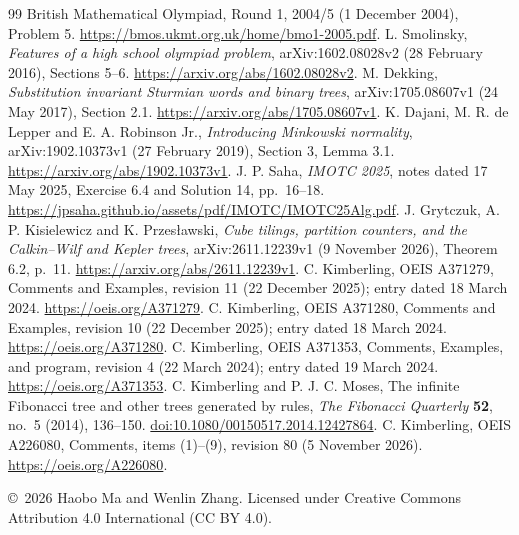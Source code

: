 \documentclass[11pt]{article}
\begin{document}
\begin{thebibliography}{99}
 British Mathematical Olympiad, Round 1, 2004/5
(1 December 2004), Problem 5.
\url{https://bmos.ukmt.org.uk/home/bmo1-2005.pdf}.
 L. Smolinsky, \emph{Features of a high school olympiad
problem}, arXiv:1602.08028v2 (28 February 2016), Sections 5--6.
\url{https://arxiv.org/abs/1602.08028v2}.
 M. Dekking, \emph{Substitution invariant Sturmian words
and binary trees}, arXiv:1705.08607v1 (24 May 2017), Section 2.1.
\url{https://arxiv.org/abs/1705.08607v1}.
 K. Dajani, M. R. de Lepper and E. A. Robinson Jr.,
\emph{Introducing Minkowski normality}, arXiv:1902.10373v1
(27 February 2019), Section 3, Lemma 3.1.
\url{https://arxiv.org/abs/1902.10373v1}.
 J. P. Saha, \emph{IMOTC 2025}, notes dated 17 May 2025,
Exercise 6.4 and Solution 14, pp.~16--18.
\url{https://jpsaha.github.io/assets/pdf/IMOTC/IMOTC25Alg.pdf}.
 J. Grytczuk, A. P. Kisielewicz and K. Przes{\l}awski,
\emph{Cube tilings, partition counters, and the Calkin--Wilf and Kepler trees},
arXiv:2611.12239v1 (9 November 2026), Theorem 6.2, p.~11.
\url{https://arxiv.org/abs/2611.12239v1}.
 C. Kimberling, OEIS A371279, Comments and Examples,
revision 11 (22 December 2025); entry dated 18 March 2024.
\url{https://oeis.org/A371279}.
 C. Kimberling, OEIS A371280, Comments and Examples,
revision 10 (22 December 2025); entry dated 18 March 2024.
\url{https://oeis.org/A371280}.
 C. Kimberling, OEIS A371353, Comments, Examples,
and program, revision 4 (22 March 2024); entry dated 19 March 2024.
\url{https://oeis.org/A371353}.
 C. Kimberling and P. J. C. Moses,
The infinite Fibonacci tree and other trees generated by rules,
\emph{The Fibonacci Quarterly} \textbf{52}, no.~5 (2014), 136--150.
\href{https://doi.org/10.1080/00150517.2014.12427864}{doi:10.1080/00150517.2014.12427864}.
 C. Kimberling, OEIS A226080, Comments, items (1)--(9),
revision 80 (5 November 2026).
\url{https://oeis.org/A226080}.
\end{thebibliography}

\bigskip\noindent\small
\copyright\ 2026 Haobo Ma and Wenlin Zhang.
Licensed under Creative Commons Attribution 4.0 International
(CC BY 4.0).
\end{document}
